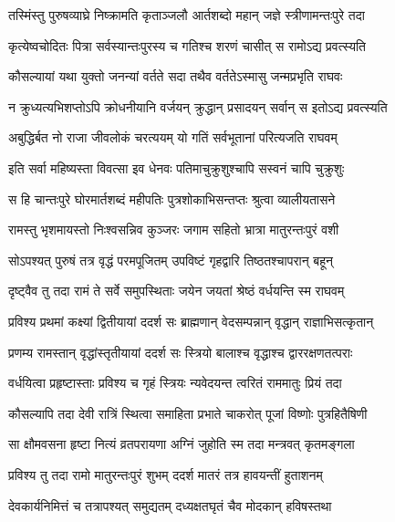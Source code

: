 
\twolineshloka
{तस्मिंस्तु पुरुषव्याघ्रे निष्क्रामति कृताञ्जलौ}
{आर्तशब्दो महान् जज्ञे स्त्रीणामन्तःपुरे तदा} %

\twolineshloka
{कृत्येष्वचोदितः पित्रा सर्वस्यान्तःपुरस्य च}
{गतिश्च शरणं चासीत् स रामोऽद्य प्रवत्स्यति} %

\twolineshloka
{कौसल्यायां यथा युक्तो जनन्यां वर्तते सदा}
{तथैव वर्ततेऽस्मासु जन्मप्रभृति राघवः} %

\twolineshloka
{न क्रुध्यत्यभिशप्तोऽपि क्रोधनीयानि वर्जयन्}
{क्रुद्धान् प्रसादयन् सर्वान् स इतोऽद्य प्रवत्स्यति} %

\twolineshloka
{अबुद्धिर्बत नो राजा जीवलोकं चरत्ययम्}
{यो गतिं सर्वभूतानां परित्यजति राघवम्} %

\twolineshloka
{इति सर्वा महिष्यस्ता विवत्सा इव धेनवः}
{पतिमाचुक्रुशुश्चापि सस्वनं चापि चुक्रुशुः} %

\twolineshloka
{स हि चान्तःपुरे घोरमार्तशब्दं महीपतिः}
{पुत्रशोकाभिसन्तप्तः श्रुत्वा व्यालीयतासने} %

\twolineshloka
{रामस्तु भृशमायस्तो निःश्वसन्निव कुञ्जरः}
{जगाम सहितो भ्रात्रा मातुरन्तःपुरं वशी} %

\twolineshloka
{सोऽपश्यत् पुरुषं तत्र वृद्धं परमपूजितम्}
{उपविष्टं गृहद्वारि तिष्ठतश्चापरान् बहून्} %

\twolineshloka
{दृष्ट्वैव तु तदा रामं ते सर्वे समुपस्थिताः}
{जयेन जयतां श्रेष्ठं वर्धयन्ति स्म राघवम्} %

\twolineshloka
{प्रविश्य प्रथमां कक्ष्यां द्वितीयायां ददर्श सः}
{ब्राह्मणान् वेदसम्पन्नान् वृद्धान् राज्ञाभिसत्कृतान्} %

\twolineshloka
{प्रणम्य रामस्तान् वृद्धांस्तृतीयायां ददर्श सः}
{स्त्रियो बालाश्च वृद्धाश्च द्वाररक्षणतत्पराः} %

\twolineshloka
{वर्धयित्वा प्रहृष्टास्ताः प्रविश्य च गृहं स्त्रियः}
{न्यवेदयन्त त्वरितं राममातुः प्रियं तदा} %

\twolineshloka
{कौसल्यापि तदा देवी रात्रिं स्थित्वा समाहिता}
{प्रभाते चाकरोत् पूजां विष्णोः पुत्रहितैषिणी} %

\twolineshloka
{सा क्षौमवसना हृष्टा नित्यं व्रतपरायणा}
{अग्निं जुहोति स्म तदा मन्त्रवत् कृतमङ्गला} %

\twolineshloka
{प्रविश्य तु तदा रामो मातुरन्तःपुरं शुभम्}
{ददर्श मातरं तत्र हावयन्तीं हुताशनम्} %

\twolineshloka
{देवकार्यनिमित्तं च तत्रापश्यत् समुद्यतम्}
{दध्यक्षतघृतं चैव मोदकान् हविषस्तथा} %

